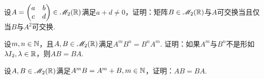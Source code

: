 \begin{problem}
  设$A=\begin{pmatrix}
    a & b \\
    c & d
  \end{pmatrix}\in\mathscr M_2(\mathbb R)$满足$a+d\ne0$，证明：矩阵$B\in\mathscr M_2(\mathbb R)$与$A$可交换当且仅当$B$与$A^2$可交换.
\end{problem}

\begin{problem}
  设$m,n\in\mathbb N$，且$A,B\in\mathscr M_2(\mathbb R)$满足$A^mB^n=B^nA^m$. 证明：如果$A^m$与$B^n$不是形如$\lambda I_2,\lambda\in\mathbb R$，则$AB=BA$.
\end{problem}

\begin{problem}
  设$A,B\in\mathscr M_2(\mathbb R)$满足$A^mB=A^m+B,m\in\mathbb N$，证明：$AB=BA$.
\end{problem}

